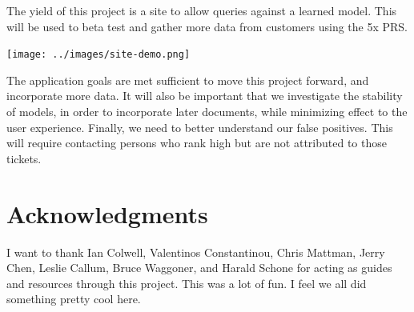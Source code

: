 \documentclass{article}
\begin{document}
\begin{multicols}{2}
The yield of this project is a site to allow queries against a learned
model. This will be used to beta test and gather more data from customers
using the 5x PRS.


\texttt{[image: ../images/site-demo.png]}

The application goals are met sufficient to move this project
forward, and incorporate more data.
It will also be important that we investigate the stability of
models\cite{Yang2016}, in order
to incorporate later documents, while minimizing effect to the user
experience. Finally, we need to better understand our false positives.
This will require contacting persons who rank high but are not attributed
to those tickets.


\section{Acknowledgments}

I want to thank Ian Colwell, Valentinos Constantinou, Chris Mattman, Jerry Chen, Leslie Callum, Bruce Waggoner, and Harald Schone for acting as guides and resources through this project. This was a lot of fun. I feel we all did something pretty cool here.

{}

\end{multicols}
\end{document}
